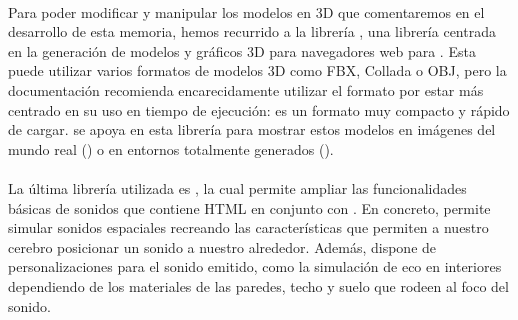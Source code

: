 \documentclass{subfiles}
\begin{document}
        \paragraph{}
        Para poder modificar y manipular los modelos en 3D que comentaremos en el desarrollo de esta memoria, hemos recurrido a la librería \threejs \cite{web:threejs}, una librería centrada en la generación de modelos y gráficos 3D para navegadores web para \js. Esta puede utilizar varios formatos de modelos 3D como FBX, Collada o OBJ, pero la documentación recomienda encarecidamente utilizar el formato \gltf por estar más centrado en su uso en tiempo de ejecución: es un formato muy compacto y rápido de cargar. \webxr se apoya en esta librería para mostrar estos modelos en imágenes del mundo real (\ra) o en entornos totalmente generados (\rv).

        \paragraph{}
        La última librería utilizada es \resonanceaudio \cite{web:resonance_audio}, la cual permite ampliar las funcionalidades básicas de sonidos que contiene HTML en conjunto con \js. En concreto, \resonanceaudio permite simular sonidos espaciales recreando las características que permiten a nuestro cerebro posicionar un sonido a nuestro alrededor. Además, dispone de personalizaciones para el sonido emitido, como la simulación de eco en interiores dependiendo de los materiales de las paredes, techo y suelo que rodeen al foco del sonido.
        
\end{document}
